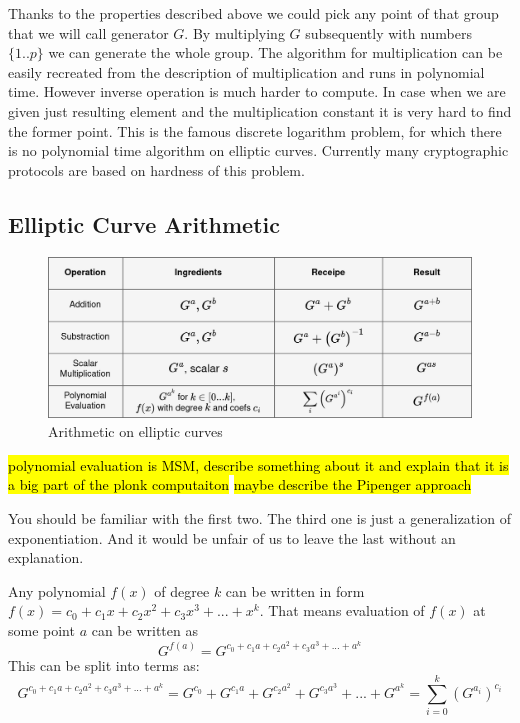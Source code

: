 
Thanks to the properties described above we could pick any point of that group that we will call generator $G$. By multiplying $G$ subsequently with numbers $\{1..p\}$ we can generate the whole group. The algorithm for multiplication can be easily recreated from the description of multiplication and runs in polynomial time. However inverse operation is much harder to compute. In case when we are given just resulting element and the multiplication constant it is very hard to find the former point. This is the famous discrete logarithm problem, for which there is no polynomial time algorithm on elliptic curves. Currently many cryptographic protocols are based on hardness of this problem.


\subsection{Elliptic Curve Arithmetic}

\begin{figure}[H]
    \centering
    \includegraphics[width=1\linewidth]{figures/ec_arithmetic.drawio.png}
    \caption{Arithmetic on elliptic curves} 
    \label{fig:ec-arithmetic}
\end{figure}

\hl{polynomial evaluation is MSM, describe something about it and explain that it is a big part of the plonk computaiton}
\hl{maybe describe the Pipenger approach}

You should be familiar with the first two. The third one is just a generalization of exponentiation. And it would be unfair of us to leave the last without an explanation.

Any polynomial $f(x)$ of degree $k$ can be written in form $f(x) = c_0 + c_1 x + c_2 x^2 + c_3 x^3 + ... + x^k$. That means evaluation of $f(x)$ at some point $a$ can be written as $$G^{f(a)} = G^{c_0 + c_1 a + c_2 a^2 + c_3 a^3 + ... + a^k}$$
This can be split into terms as:$$G^{c_0 + c_1 a + c_2 a^2 + c_3 a^3 + ... + a^k} = G^{c_0} + G^{c_1 a} + G^{c_2 a^2} + G^{c_3 a^3} + ... + G^{a^k} = \sum_{i=0}^k (G^{a_i})^{c_i}$$

